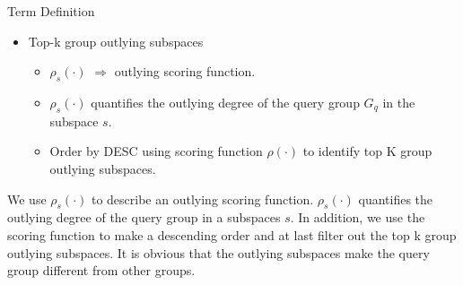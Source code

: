 \documentclass[
 size=14pt,
 paper=smartboard,  %
 mode=present, 		%
 display=slides, 	%
 style=tuliplab,  	%
 pauseslide,
 fleqn,leqno]{powerdot}
\begin{document}
\begin{slide}[toc=,bm=]{Term Definition}
\begin{itemize}
\item
Top-k group outlying subspaces

\begin{itemize}
\item
$\rho_s(\cdot)$ $\Rightarrow$ outlying scoring function.

\item
$\rho_s(\cdot)$ quantifies the outlying degree of the
query group $G_q$ in the subspace $s$.

\item
Order by DESC using scoring function $\rho(\cdot)$
to identify top K group outlying subspaces.
\end{itemize}
\end{itemize}

\begin{figure}[htbp]
    \centering
    \label{fig:Basketball-Example}
\end{figure}

\begin{note}
We use $\rho_s(\cdot)$ to describe an outlying scoring function.
$\rho_s(\cdot)$ quantifies the outlying degree of the query group in a subspaces $s$.
In addition,
we use the scoring function to make a descending order and at last
filter out the top k group outlying subspaces.
It is obvious that the outlying subspaces make the
query group different from other groups.
\end{note}

\end{slide}
\end{document}
